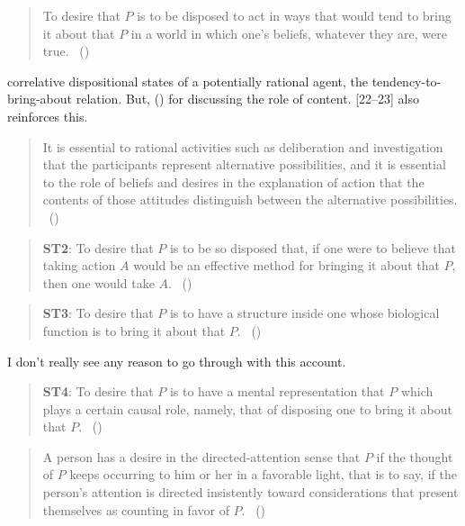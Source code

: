 \documentclass[10pt]{article}
\begin{document}
\begin{quote}
  To desire that \(P\) is to be disposed to act in ways that would tend to bring it about that \(P\) in a world in which one's beliefs, whatever they are, were true.\nolinebreak
  \mbox{ }\hfill(\citeyear[15]{Stalnaker:1984aa})
\end{quote}
{\color{red} correlative dispositional states of a potentially rational agent, the tendency-to-bring-about relation. But, (\citeyear[18]{Stalnaker:1984aa}) for \citeauthor{Stalnaker:1984aa} discussing the role of content. [22--23] also reinforces this.
    \begin{quote}
      It is essential to rational activities such as deliberation and investigation that the participants represent alternative possibilities, and it is essential to the role of beliefs and desires in the explanation of action that the contents of those attitudes distinguish between the alternative possibilities.\nolinebreak
      \mbox{ }\hfill(\citeyear[23]{Stalnaker:1984aa})
    \end{quote}
  }
  
\begin{quote}
  \textbf{ST2}:
  To desire that \(P\) is to be so disposed that, if one were to believe that taking action \(A\) would be an effective method for bringing it about that \(P\), then one would take \(A\).\nolinebreak
  \mbox{ }\hfill(\citeyear[17]{Schroeder:2004aa})
\end{quote}

\begin{quote}
  \textbf{ST3}:
  To desire that \(P\) is to have a structure inside one whose biological function is to bring it about that \(P\).\nolinebreak
  \mbox{ }\hfill(\citeyear[18]{Schroeder:2004aa})
\end{quote}

{\color{red}
  I don't really see any reason to go through with this account.
}

\begin{quote}
  \textbf{ST4}:
  To desire that \(P\) is to have a mental representation that \(P\) which plays a certain causal role, namely, that of disposing one to bring it about that \(P\).\nolinebreak
  \mbox{ }\hfill(\citeyear[24]{Schroeder:2004aa})
\end{quote}

\begin{quote}
  A person has a desire in the directed-attention sense that \(P\) if the thought of \(P\) keeps occurring to him or her in a favorable light, that is to say, if the person’s attention is directed insistently toward considerations that present themselves as counting in favor of \(P\).\nolinebreak
  \mbox{ }(\citeyear[39]{Scanlon:1998aa})
\end{quote}
\end{document}
